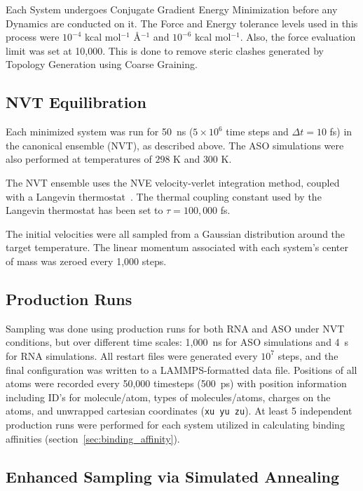 Each System undergoes Conjugate Gradient Energy Minimization before any Dynamics are conducted on it. The Force and Energy tolerance levels used in this process were $10^{-4}$ kcal mol$^{-1}$ \AA$^{-1}$ and $10^{-6}$ kcal mol$^{-1}$. Also, the force evaluation limit was set at 10,000. This is done to remove steric clashes generated by Topology Generation using Coarse Graining.

\subsection{NVT Equilibration}
Each minimized system was run for 50~ns ($5 \times 10^{6}$ time steps and $\Delta t=10$ fs) in the canonical ensemble (NVT), as described above. The ASO simulations were also performed at temperatures of $298$ K and $300$ K.

The NVT ensemble uses the NVE velocity-verlet integration method, coupled with a Langevin thermostat~\cite{Schneider1978}. The thermal coupling constant used by the Langevin thermostat has been set to $\tau = 100,000$ fs.

The initial velocities were all sampled from a Gaussian distribution around the target temperature. The linear momentum associated with each system's center of mass was zeroed every 1,000 steps.

\subsection{Production Runs}
\label{sec:production}

Sampling was done using production runs for both RNA and ASO under NVT conditions, but over different time scales: 1,000~ns for ASO simulations and 4~\textmu s for RNA simulations. 
All restart files were generated every $10^7$ steps, and the final configuration was written to a LAMMPS-formatted data file. 
Positions of all atoms were recorded every 50,000 timesteps (500~ps) with position information including ID’s for molecule/atom, types of molecules/atoms, charges on the atoms, and unwrapped cartesian coordinates (\texttt{xu yu zu}).
At least 5 independent production runs were performed for each system utilized in calculating binding affinities (section~\ref{sec:binding_affinity}).


\subsection{Enhanced Sampling via Simulated Annealing}
\label{sec:sa}

